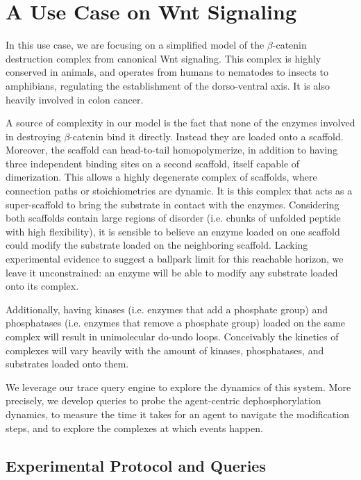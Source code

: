 \section{A Use Case on Wnt Signaling}\label{sec:use-case}

In this use case, we are focusing on a simplified model of the
$\beta$-catenin destruction complex from canonical Wnt signaling. This
complex is highly conserved in animals, and operates from humans to
nematodes to insects to amphibians, regulating the establishment of
the dorso-ventral axis. It is also heavily involved in colon cancer.

A source of complexity in our model is the fact that none of the
enzymes involved in destroying $\beta$-catenin bind it directly.
Instead they are loaded onto a scaffold. Moreover, the scaffold can
head-to-tail homopolymerize, in addition to having three independent
binding sites on a second scaffold, itself capable of dimerization.
This allows a highly degenerate complex of scaffolds, where connection
paths or stoichiometries are dynamic. It is this complex that acts as a
super-scaffold to bring the substrate in contact with the
enzymes. Considering both scaffolds contain large regions of disorder
(i.e. chunks of unfolded peptide with high flexibility), it is
sensible to believe an enzyme loaded on one scaffold could modify the
substrate loaded on the neighboring scaffold. Lacking experimental
evidence to suggest a ballpark limit for this reachable horizon, we
leave it unconstrained: an enzyme will be able to modify any substrate
loaded onto its complex.

Additionally, having kinases (i.e. enzymes that add a phosphate group)
and phosphatases (i.e. enzymes that remove a phosphate group) loaded on
the same complex will result in unimolecular do-undo loops. Conceivably
the kinetics of complexes will vary heavily with the amount of kinases,
phosphatases, and substrates loaded onto them.

We leverage our trace query engine to explore the dynamics of this
system. More precisely, we develop queries to probe the agent-centric
dephosphorylation dynamics, to measure the time it takes for an agent
to navigate the modification steps, and to explore the complexes at
which events happen.


\subsection{Experimental Protocol and Queries}

